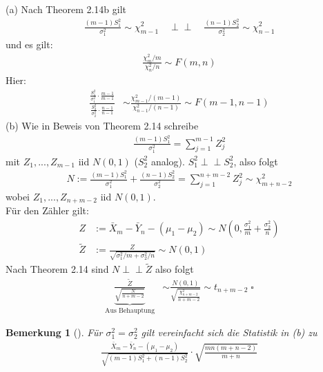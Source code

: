 \documentclass[a4paper,openany]{book}
\theoremstyle{mytheoremstyle}
\newtheorem*{bem}{Bemerkung}
\theoremstyle{mytheoremstyle2}
\newtheorem*{cbew}{Beweis}
\newenvironment{bew}[1][]{%
  \ifthenelse{\boolean{showbew}}{%
    \begin{cbew}[#1]%
  }{%
    \expandafter\comment%
  }%
}{%
  \ifthenelse{\boolean{showbew}}{%
    \end{cbew}%
  }{%
    \expandafter\endcomment%
  }%
}
\begin{document}
\begin{bew}[]
  (a) Nach Theorem 2.14b gilt 
  \begin{align*}
    \frac{(m-1)S_1^2}{\sigma _1^2}\sim \chi _{m-1}^2 \quad\perp\!\!\!\perp \quad  \frac{(n-1)S_2^2}{\sigma _2^2}\sim \chi _{n-1}^2
  \end{align*}
  und es gilt:  
  \begin{align*}
    \frac{\chi _m^2/m}{\chi _n^2/n}\sim F(m,n)
  \end{align*}
  Hier: 
  \begin{align*}
    \frac{\frac{S_1^2}{\sigma _1^2}\cdot \frac{m-1}{m-1}}{\frac{S_2^2}{\sigma _2^2}\cdot \frac{n-1}{n-1}} 
    &\sim \frac{\chi _{m-1}^2/(m-1)}{\chi _{n-1}^2/(n-1)}\sim F(m-1,n-1)
  \end{align*}
  (b) Wie in Beweis von Theorem 2.14 schreibe
  \begin{align*}
    \frac{(m-1)S_1^2}{\sigma _1^2}=\sum_{j=1}^{m-1}{Z_j^2}
  \end{align*}
  mit $Z_1,...,Z _{m-1}$ iid $N(0,1)$ ($S_2^2$ analog). $S_1^2 \perp\!\!\!\perp S_2^2$, also folgt 
  \begin{align*}
    N:=\frac{(m-1)S_1^2}{\sigma _1^2}+\frac{(n-1)S_2^2}{\sigma _2^2}=\sum_{j=1}^{n+m-2}{Z_j^2}\sim \chi _{m+n-2}^2
  \end{align*}
  wobei $Z_1,...,Z _{n+m-2}$ iid $N(0,1)$. \\
  Für den Zähler gilt:
  \begin{align*}
    Z &:= \bar{X}_m-\bar{Y}_n-(\mu _1-\mu _2)\sim N \left(0, \frac{\sigma _1^2}{m}+\frac{\sigma _2^2}{n}\right) \\
    \tilde{Z}&:=\frac{Z}{\sqrt{\sigma _1^2/m+\sigma _2^2/n}}\sim N(0,1)
  \end{align*}
  Nach Theorem 2.14 sind $N \perp\!\!\!\perp \tilde{Z}$ also folgt 
  \begin{align*}
    \underbrace{\frac{\tilde{Z}}{\sqrt{\frac{N}{n+m-2}}}}_{\text{Aus Behauptung}}
    &\sim \frac{N(0,1)}{\sqrt{\frac{\chi _{n+m-2}^2}{n+m-2}}}\sim t _{n+m-2}\;\square
  \end{align*}
\end{bew}
\begin{bem}[]
  Für $\sigma _1^2=\sigma _2^2$ gilt vereinfacht sich die Statistik in (b) zu
  \begin{align*}
    \frac{\bar{X}_m-\bar{Y}_n-(\mu _1-\mu _2)}{\sqrt{(m-1)S_1^2+(n-1)S_2^2}}\cdot \sqrt{\frac{mn(m+n-2)}{m+n}}
  \end{align*}
\end{bem}
\end{document}
